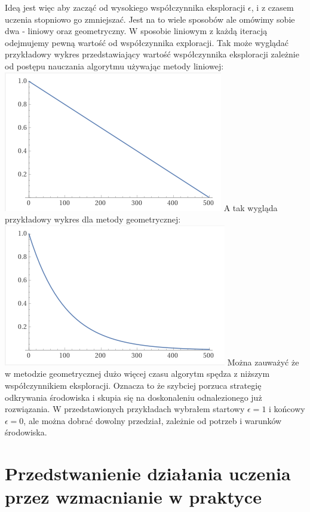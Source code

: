 \documentclass[a4paper,12pt]{article}
\begin{document}
Ideą jest więc aby zacząć od wysokiego współczynnika eksploracji \(\epsilon\), i z czasem uczenia stopniowo go zmniejszać. Jest na to wiele sposobów ale omówimy sobie dwa - liniowy oraz geometryczny. W sposobie liniowym z każdą iteracją odejmujemy pewną wartość od współczynnika exploracji. 
\newline \newline Tak może wyglądać przykładowy wykres przedstawiający wartość współczynnika eksploracji zależnie od postępu nauczania algorytmu używając metody liniowej:
\newline \includegraphics{lin.png}
\newline
A tak wygląda przykładowy wykres dla metody geometrycznej:
\newline \includegraphics{geo.png}
\newline Można zauważyć że w metodzie geometrycznej dużo więcej czasu algorytm spędza z niższym współczynnikiem eksploracji. Oznacza to że szybciej porzuca strategię odkrywania środowiska i skupia się na doskonaleniu odnalezionego już rozwiązania. W przedstawionych przykładach wybrałem startowy \(\epsilon = 1\) i końcowy \(\epsilon = 0\), ale można dobrać dowolny przedział, zależnie od potrzeb i warunków środowiska.  

\section{Przedstwanienie działania uczenia przez wzmacnianie w praktyce}
\end{document}
